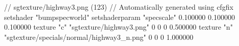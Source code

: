 // sgtexture/highway3.png (123)
// Automatically generated using cfgfix
setshader "bumpspecworld"
setshaderparam "specscale" 0.100000 0.100000 0.100000
texture "c" "sgtexture/highway3.png" 0 0 0 0.500000
texture "n" "sgtexture/specials/normal/highway3_n.png" 0 0 0 1.000000
